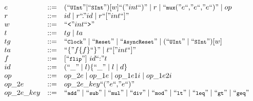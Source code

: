 \begin{figure}[htbp]
{\[\begin{array}{l l l}
%
  e & ::= & (\mbox{``\fnprettyll{UInt}''} | \mbox{``\fnprettyll{SInt}''}) [w] \mbox{``(''}int\mbox{``)''} \mid r \mid \mbox{``\fnprettyll{mux}(''}e\mbox{``,''} e\mbox{``,''} e\mbox{``)''}
        \mid op\\
%
%
r & ::= & id \mid r\mbox{``.''}id \mid r\mbox{``[''}int\mbox{``]''}\\
w & ::= & \mbox{``{\tt <}''} int \mbox{``{\tt >}''}\\
%
%
%
t & ::= & tg \mid ta \\
 tg & ::= &  \mbox{``\fnprettyll{Clock}''} \mid \mbox{``\fnprettyll{Reset}''} \mid \mbox{``\fnprettyll{AsyncReset}''} \mid (\mbox{``\fnprettyll{UInt}''} \mid \mbox{``\fnprettyll{SInt}''}) [w] \\
%
  ta & ::= &\mbox{``\{''} f \{f\}\mbox{``\}''} \mid t \mbox{``[''} int \mbox{``]''} \\
%
    f & ::= & [\mbox{``\fnprettyll{flip}''}]\ id\mbox{``:''}t\\
%
id & ::= & ( \mbox{``\_''} \mid l) \{ \mbox{``\_''} \mid l \mid d\} \\
op & ::= & op\_2e \mid op\_1e \mid op\_1e1i \mid op\_1e2i \\
op\_2e & ::= & op\_2e\_key \mbox{``(''}  e \mbox{``,''}  e \mbox{``)''} \\
%
op\_2e\_key & ::= &  \mbox{``\fnprettyll{add}''}  \mid  \mbox{``\fnprettyll{sub}''}  \mid \mbox{``\fnprettyll{mul}''} \mid \mbox{``\fnprettyll{div}''} \mid \mbox{``\fnprettyll{mod}''} \mid \mbox{``\fnprettyll{lt}''} \mid \mbox{``\fnprettyll{leq}''} \mid \mbox{``\fnprettyll{gt}''} \mid \mbox{``\fnprettyll{geq}''}\\

\end{array}\]}
\end{figure}
